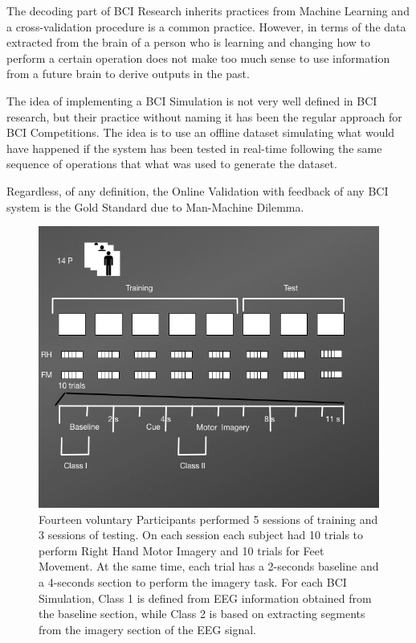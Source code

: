 \begin{story}
The decoding part of BCI Research inherits practices from Machine Learning and a cross-validation procedure is a common practice.  However, in terms of the data extracted from the brain of a person who is learning and changing how to perform a certain operation does not make too much sense to use information from a future brain to derive outputs in the past.

The idea of implementing a BCI Simulation is not very well defined in BCI research, but their practice without naming it has been the regular approach for BCI Competitions. The idea is to use an offline dataset simulating what would have happened if the system has been tested in real-time following the same sequence of operations that what was used to generate the dataset.

Regardless, of any definition, the Online Validation with feedback of any BCI system is the Gold Standard due to Man-Machine Dilemma.
\end{story}


\begin{figure}[]
\centering
\includegraphics[scale=0.6]{images/DatasetIIIDiagram2.png}
\caption[Motor Imagery Experimental Protocol]{Fourteen voluntary Participants performed 5 sessions of training and 3 sessions of testing.  On each session each subject had 10 trials to perform Right Hand Motor Imagery and 10 trials for Feet Movement.  At the same time, each trial has a 2-seconds baseline and a 4-seconds section to perform the imagery task.  For each BCI Simulation, Class 1 is defined from EEG information obtained from the baseline section, while Class 2 is based on extracting segments from the imagery section of the EEG signal.}
\label{fig:midatasetdiagram}
\end{figure}


